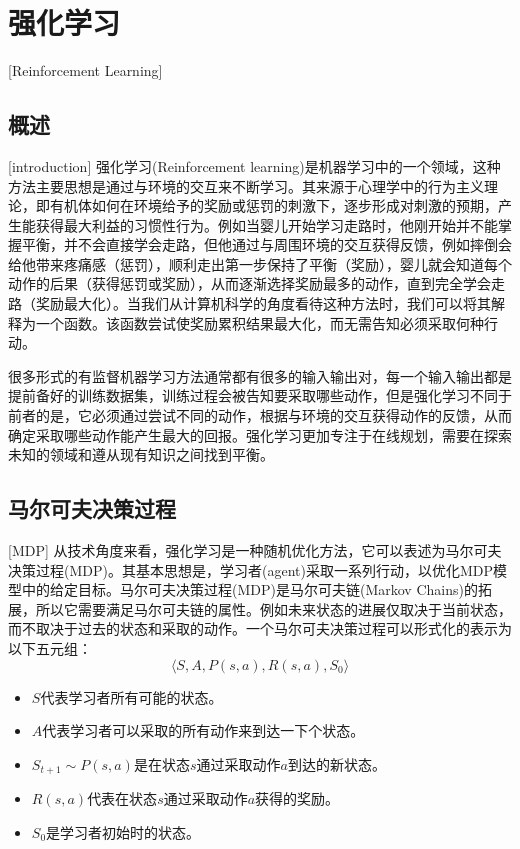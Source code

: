 \section{强化学习}[Reinforcement Learning]
\subsection{概述}[introduction]
强化学习(Reinforcement learning)\cite{RLIntroduction}是机器学习中的一个领域，这种方法主要思想是通过与环境的交互来不断学习。其来源于心理学中的行为主义理论，即有机体如何在环境给予的奖励或惩罚的刺激下，逐步形成对刺激的预期，产生能获得最大利益的习惯性行为。例如当婴儿开始学习走路时，他刚开始并不能掌握平衡，并不会直接学会走路，但他通过与周围环境的交互获得反馈，例如摔倒会给他带来疼痛感（惩罚），顺利走出第一步保持了平衡（奖励），婴儿就会知道每个动作的后果（获得惩罚或奖励），从而逐渐选择奖励最多的动作，直到完全学会走路（奖励最大化）。当我们从计算机科学的角度看待这种方法时，我们可以将其解释为一个函数。该函数尝试使奖励累积结果最大化，而无需告知必须采取何种行动。

很多形式的有监督机器学习方法通常都有很多的输入输出对，每一个输入输出都是提前备好的训练数据集，训练过程会被告知要采取哪些动作，但是强化学习不同于前者的是，它必须通过尝试不同的动作，根据与环境的交互获得动作的反馈，从而确定采取哪些动作能产生最大的回报。强化学习更加专注于在线规划，需要在探索未知的领域和遵从现有知识之间找到平衡。

\subsection{马尔可夫决策过程}[MDP]
从技术角度来看，强化学习是一种随机优化方法，它可以表述为马尔可夫决策过程(MDP)\cite{MDP}。其基本思想是，学习者(agent)采取一系列行动，以优化MDP模型中的给定目标。马尔可夫决策过程(MDP)是马尔可夫链(Markov Chains)的拓展，所以它需要满足马尔可夫链的属性。例如未来状态的进展仅取决于当前状态，而不取决于过去的状态和采取的动作。一个马尔可夫决策过程可以形式化的表示为以下五元组：
\begin{equation}\label{MDP5}
\langle S, A, P(s,a),R(s,a),S_0 \rangle
\end{equation}
\begin{itemize}
    \item $S$代表学习者所有可能的状态。
    \item $A$代表学习者可以采取的所有动作来到达一下个状态。
    \item $S_{t+1}\sim P(s,a)$是在状态$s$通过采取动作$a$到达的新状态。
    \item $R(s,a)$代表在状态$s$通过采取动作$a$获得的奖励。
    \item $S_0$是学习者初始时的状态。
\end{itemize}

